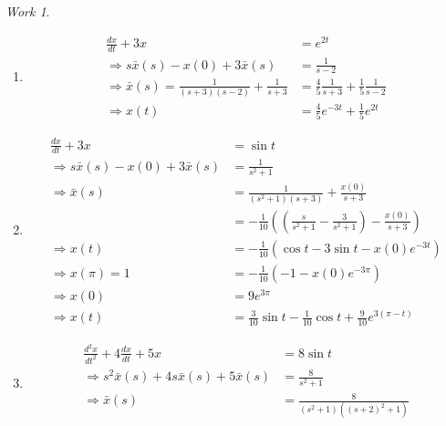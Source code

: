 \documentclass{report}
\theoremstyle{definition}
\theoremstyle{remark}
\newtheorem*{work}{Work}
\newcommand{\od}[2]{\frac{d #1}{d#2}}
\newcommand{\odt}[2]{\frac{d^2 #1}{d#2^2}}
\begin{document}
\begin{work}
    \leavevmode
    \begin{enumerate}[label=(\alph*)]
        \item \begin{equation*}
            \begin{split}
                \od{x}{t} + 3x &= e^{2t}  \\
                \Rightarrow s\bar x(s) - x(0)+3\bar x(s)&=\frac{1}{s-2} \\
                \Rightarrow \bar x(s) = \frac{1}{(s+3)(s-2)}+\frac{1}{s+3}&=\frac{4}{5}\frac{1}{s+3}+\frac{1}{5}\frac{1}{s-2}\\
                \Rightarrow x(t)&=\frac{4}{5}e^{-3t}+\frac{1}{5}e^{2t}
            \end{split}
        \end{equation*}
        \item \begin{equation*}
            \begin{split}
                \od{x}{t} + 3x &= \sin t \\ 
                \Rightarrow s\bar x(s)-x(0)+3\bar x(s)&=\frac{1}{s^2+1} \\
                \Rightarrow \bar x(s)&=\frac{1}{(s^2+1)(s+3)}+\frac{x(0)}{s+3} \\
                &=-\frac{1}{10}\left( \left( \frac{s}{s^2+1}-\frac{3}{s^2+1}\right) - \frac{x(0)}{s+3} \right) \\
                \Rightarrow x(t)&=-\frac{1}{10}(\cos t-3\sin t-x(0)e^{-3t}) \\
                \Rightarrow x(\pi) =1&=-\frac{1}{10}(-1-x(0)e^{-3\pi}) \\
                \Rightarrow x(0)&=9e^{3\pi}\\
                \Rightarrow x(t) &=\frac{3}{10}\sin t-\frac{1}{10}\cos t+ \frac{9}{10}e^{3(\pi -t)}
            \end{split}
        \end{equation*}
        \item \begin{equation*}
            \begin{split}
                \odt{x}{t} +4\od{x}{t}+5x&=8 \sin t  \\
                \Rightarrow s^2\bar x(s)+4s\bar x(s)+5\bar x(s)&=\frac{8}{s^2+1} \\
                \Rightarrow\bar x(s)&= \frac{8}{(s^2+1)((s+2)^2+1)} \\

\end{split}
\end{equation*}
\end{enumerate}
\end{work}
\end{document}
